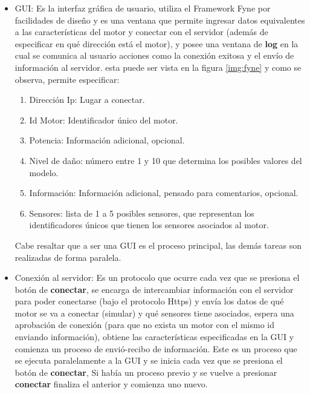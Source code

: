 \begin{itemize}
    \item GUI: Es la interfaz gráfica de usuario, utiliza el Framework Fyne por
        facilidades
        de diseño y es una ventana que permite ingresar datos equivalentes
        a las características del motor y conectar con el servidor (además de
        especificar en qué dirección está el motor), y posee una ventana de
        \textbf{log}  en la cual se comunica al usuario acciones como la conexión exitosa y
        el envío de información al servidor. esta puede ser vista
        en la figura \ref{img:fyne} y como se observa, permite especificar:
        \begin{enumerate}
            \item Dirección Ip: Lugar a conectar.
            \item Id Motor: Identificador único del motor.
            \item Potencia: Información adicional, opcional.
            \item Nivel de daño: número entre 1 y 10 que determina los posibles
                valores del modelo.
            \item Información: Información adicional, pensado para comentarios,
                opcional.
            \item Sensores: lista de 1 a 5 posibles sensores, que representan
                los identificadores únicos que tienen los sensores asociados
                al motor.
        \end{enumerate}

        Cabe resaltar que a ser una GUI es el proceso principal, las demás
        tareas son realizadas de forma paralela.

    \item Conexión al servidor: Es un protocolo que ocurre cada vez que se presiona
        el botón de \textbf{conectar}, se encarga de intercambiar información con el servidor
        para poder conectarse (bajo el protocolo Https) y envía los datos de
        qué motor se va a conectar (simular) y qué sensores tiene asociados, espera
        una aprobación de conexión (para que no exista un motor con el mismo id enviando
        información), obtiene las características especificadas en la GUI y
        comienza un proceso de envió-recibo de información.
        Este es un proceso
        que se ejecuta paralelamente a la GUI y se inicia cada vez que se
        presiona el botón de \textbf{conectar}, Si había un proceso previo y se vuelve a
        presionar \textbf{conectar} finaliza el anterior y comienza uno nuevo.


\end{itemize}
